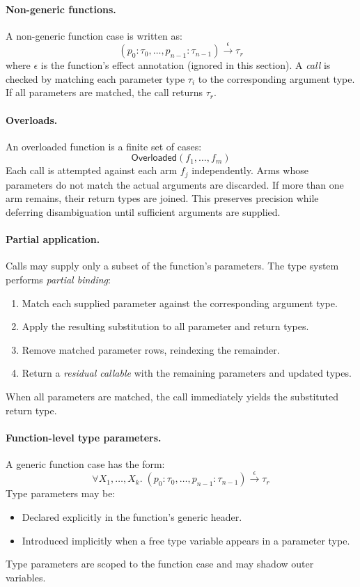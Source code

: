 \paragraph{Non-generic functions.}
A non-generic function case is written as:
\[
(p_0 : \tau_0, \dots, p_{n-1} : \tau_{n-1}) \xrightarrow{\epsilon} \tau_r
\]
where $\epsilon$ is the function's effect annotation (ignored in this section).
A \emph{call} is checked by matching each parameter type $\tau_i$ to the corresponding
argument type. If all parameters are matched, the call returns $\tau_r$.

\paragraph{Overloads.}
An overloaded function is a finite set of cases:
\[
\mathsf{Overloaded}(f_1, \dots, f_m)
\]
Each call is attempted against each arm $f_j$ independently.
Arms whose parameters do not match the actual arguments are discarded.
If more than one arm remains, their return types are joined.
This preserves precision while deferring disambiguation until sufficient arguments are supplied.

\paragraph{Partial application.}
Calls may supply only a subset of the function's parameters.
The type system performs \emph{partial binding}:
\begin{enumerate}
    \item Match each supplied parameter against the corresponding argument type.
    \item Apply the resulting substitution to all parameter and return types.
    \item Remove matched parameter rows, reindexing the remainder.
    \item Return a \emph{residual callable} with the remaining parameters and updated types.
\end{enumerate}
When all parameters are matched, the call immediately yields the substituted return type.

\paragraph{Function-level type parameters.}
A generic function case has the form:
\[
\forall X_1, \dots, X_k .\; (p_0 : \tau_0, \dots, p_{n-1} : \tau_{n-1}) \xrightarrow{\epsilon} \tau_r
\]
Type parameters may be:
\begin{itemize}
    \item Declared explicitly in the function's generic header.
    \item Introduced implicitly when a free type variable appears in a parameter type.
\end{itemize}
Type parameters are scoped to the function case and may shadow outer variables.

